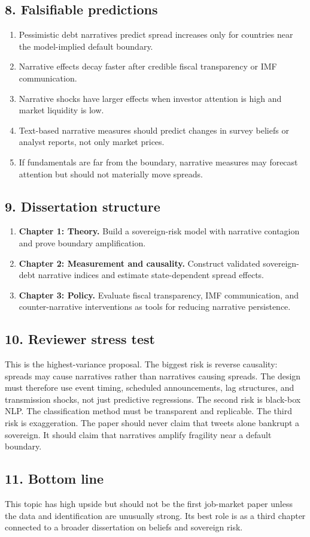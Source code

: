 \documentclass[11pt]{article}
\begin{document}
\subsection*{8. Falsifiable predictions}
\begin{enumerate}[label=\textbf{P\arabic*.},leftmargin=*]
\item Pessimistic debt narratives predict spread increases only for countries near the model-implied default boundary.
\item Narrative effects decay faster after credible fiscal transparency or IMF communication.
\item Narrative shocks have larger effects when investor attention is high and market liquidity is low.
\item Text-based narrative measures should predict changes in survey beliefs or analyst reports, not only market prices.
\item If fundamentals are far from the boundary, narrative measures may forecast attention but should not materially move spreads.
\end{enumerate}

\subsection*{9. Dissertation structure}
\begin{enumerate}[leftmargin=*]
\item \textbf{Chapter 1: Theory.} Build a sovereign-risk model with narrative contagion and prove boundary amplification.
\item \textbf{Chapter 2: Measurement and causality.} Construct validated sovereign-debt narrative indices and estimate state-dependent spread effects.
\item \textbf{Chapter 3: Policy.} Evaluate fiscal transparency, IMF communication, and counter-narrative interventions as tools for reducing narrative persistence.
\end{enumerate}

\subsection*{10. Reviewer stress test}
This is the highest-variance proposal. The biggest risk is reverse causality: spreads may cause narratives rather than narratives causing spreads. The design must therefore use event timing, scheduled announcements, lag structures, and transmission shocks, not just predictive regressions. The second risk is black-box NLP. The classification method must be transparent and replicable. The third risk is exaggeration. The paper should never claim that tweets alone bankrupt a sovereign. It should claim that narratives amplify fragility near a default boundary.

\subsection*{11. Bottom line}
This topic has high upside but should not be the first job-market paper unless the data and identification are unusually strong. Its best role is as a third chapter connected to a broader dissertation on beliefs and sovereign risk.


\newpage
\printbibliography
\end{document}
